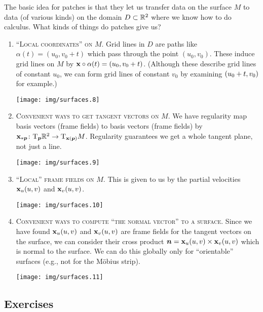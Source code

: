 The basic idea for patches is that they let us transfer data on the
surface $M$ to data (of various kinds) on the domain $D\subset\mathbb{R}^{2}$
where we know how to do calculus. What kinds of things do patches give
us?
\begin{enumerate}
\item \textsc{``Local coordinates'' on $M$.} Grid lines in $D$ are paths like
  $\alpha(t)=(u_{0},v_{0}+t)$ which pass through the point
  $(u_{0},v_{0})$. These induce grid lines on $M$ by
  $\mathbf{x}\circ\alpha(t)=\mathbf{(}u_{0},v_{0}+t)$. (Although these
  describe grid lines of constant $u_{0}$, we can form grid lines of
  constant $v_{0}$ by examining $\mathbf{(}u_{0}+t,v_{0})$ for example.)
  \begin{center}
    \texttt{[image: img/surfaces.8]}
  \end{center}
\item \textsc{Convenient ways to get tangent vectors on $M$.} We have
  regularity map basis vectors (frame fields) to basis vectors (frame
  fields) by $\mathbf{x}_{*\boldsymbol{p}}\colon\mathrm{T}_{\boldsymbol{p}}\mathbb{R}^{2}\to\mathrm{T}_{\mathbf{x}(\boldsymbol{p})}M$.
  Regularity guarantees we get a whole tangent plane, not just a line.
  \begin{center}
    \texttt{[image: img/surfaces.9]}
  \end{center}
\item \textsc{``Local'' frame fields on $M$.} This is given to us by the
  partial velocities $\mathbf{x}_{u}(u,v)$ and $\mathbf{x}_{v}(u,v)$.
  \begin{center}
    \texttt{[image: img/surfaces.10]}
  \end{center}
\item \textsc{Convenient ways to compute ``the normal vector'' to a surface.}
  Since we have found $\mathbf{x}_{u}(u,v)$ and $\mathbf{x}_{v}(u,v)$ are
  frame fields for the tangent vectors on the surface, we can consider
  their cross product
  $\boldsymbol{n}=\mathbf{x}_{u}(u,v)\times\mathbf{x}_{v}(u,v)$ which is normal
  to the surface.
  We can do this globally only for ``orientable'' surfaces (e.g., not
  for the M\"{o}bius strip).
  \begin{center}
    \texttt{[image: img/surfaces.11]}
  \end{center}
\end{enumerate}


\subsection*{Exercises}

